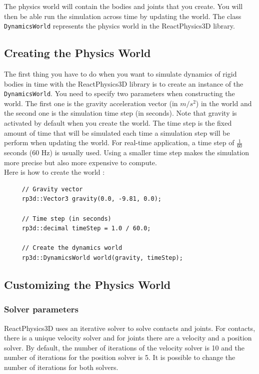 \documentclass[a4paper,12pt]{article}
\begin{document}
    The physics world will contain the bodies and joints that you create. You will then be able run the simulation across time by updating the world.
    The class \texttt{DynamicsWorld} represents the physics world in the ReactPhysics3D library.

    \subsection{Creating the Physics World}

    The first thing you have to do when you want to simulate dynamics of rigid bodies in time with the ReactPhysics3D library is to create an instance
    of the \texttt{DynamicsWorld}. You need to specify two parameters when constructing the world. The first one is the gravity acceleration  vector (in $m / s^2$) in the world and
    the second one is the simulation time step (in seconds). Note that gravity is activated by default when you create the world. The time step is the fixed amount of time that will be simulated
    each time a simulation step will be perform when updating the world. For real-time application, a time step of $\frac{1}{60}$ seconds (60 Hz) is usually used. Using a smaller time step
    makes the simulation more precise but also more expensive to compute. \\

    Here is how to create the world : \\

    \begin{lstlisting}
     // Gravity vector
     rp3d::Vector3 gravity(0.0, -9.81, 0.0);

     // Time step (in seconds)
     rp3d::decimal timeStep = 1.0 / 60.0;

     // Create the dynamics world
     rp3d::DynamicsWorld world(gravity, timeStep);
  \end{lstlisting}

    \subsection{Customizing the Physics World}

    \subsubsection{Solver parameters}

    ReactPhysics3D uses an iterative solver to solve contacts and joints. For contacts, there is a unique velocity solver and for joints there are a velocity and a
    position solver. By default, the number of iterations of the velocity solver is 10 and the number of iterations for the position solver is 5. It is possible to
    change the number of iterations for both solvers.
\end{document}
